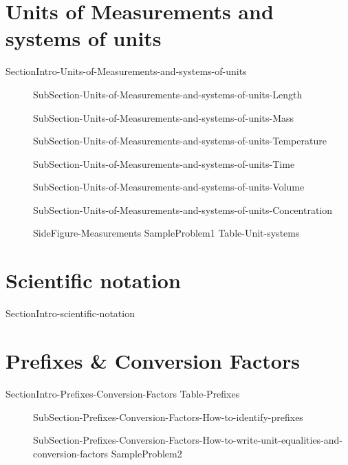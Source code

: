 \documentclass[main.tex]{subfiles}
\begin{document}
\section{Units of Measurements and systems of units}
{SectionIntro-Units-of-Measurements-and-systems-of-units}
\sloppy\begin{description}
\item[]{SubSection-Units-of-Measurements-and-systems-of-units-Length}
\item[]{SubSection-Units-of-Measurements-and-systems-of-units-Mass}
\item[]{SubSection-Units-of-Measurements-and-systems-of-units-Temperature}
\item[]{SubSection-Units-of-Measurements-and-systems-of-units-Time}
\item[]{SubSection-Units-of-Measurements-and-systems-of-units-Volume}
\item[]{SubSection-Units-of-Measurements-and-systems-of-units-Concentration}

{SideFigure-Measurements}
{SampleProblem1}
{Table-Unit-systems}
\end{description}

\section{Scientific notation} {SectionIntro-scientific-notation}

 

\section{Prefixes \& Conversion Factors}
{SectionIntro-Prefixes-Conversion-Factors}
{Table-Prefixes}
\sloppy\begin{description}
\item[]{SubSection-Prefixes-Conversion-Factors-How-to-identify-prefixes}
\item[]{SubSection-Prefixes-Conversion-Factors-How-to-write-unit-equalities-and-conversion-factors}
{SampleProblem2}
\end{description}
\end{document}
